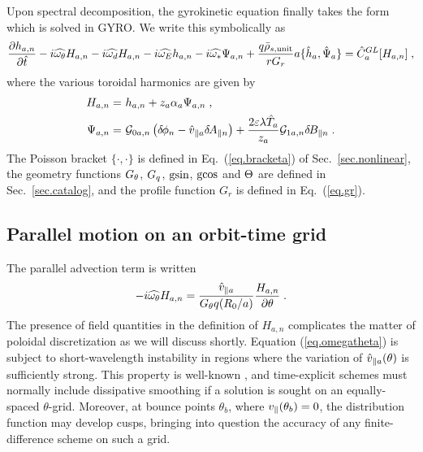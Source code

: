 Upon spectral decomposition, the gyrokinetic equation finally takes 
the form which is solved in GYRO.  We write this symbolically as
%
\begin{equation}
\frac{\partial h_{a,n}}{\partial\hat{t}} 
-i \widehat{\omega_\theta} H_{a,n}
-i \widehat{\omega_d} H_{a,n}
-i \widehat{\omega_E} h_{a,n}
-i \widehat{\omega_*} \Psi_{a,n}
+ \frac{q\bar{\rho}_{s,{\rm unit}}}{r G_r} a \{ \hat{h}_a,\hat{\Psi}_a \}
= \hat{C}_a^{GL} [H_{a,n}] \; ,
\label{eq.hnnorm}
\end{equation}
%
where the various toroidal harmonics are given by
% 
\begin{align}
H_{a,n} = &~h_{a,n} + z_a \alpha_a \Psi_{a,n} \; , \\
\Psi_{a,n} = &~{\cal G}_{0a,n} \left( \delta \hskip -1pt \phi_n - \hat{v}_{\parallel a} \delta \hskip -1pt A_{\parallel n} \right) + 
\frac{2 \varepsilon \lambda \hat{T}_a}{z_a} {\cal G}_{1a,n}\delta \hskip -1pt B_{\parallel n} \; . 
\end{align}
%
The Poisson bracket $\{ \cdot, \cdot \}$ is defined in Eq.~(\ref{eq.bracketa}) 
of Sec.~\ref{sec.nonlinear}, the geometry functions $G_\theta$, $G_q$, $\text{gsin}$, 
$\text{gcos}$ and $\Theta$ are defined in Sec.~\ref{sec.catalog}, and the 
profile function $G_r$ is defined in Eq.~(\ref{eq.gr}). 

\subsection{Parallel motion on an orbit-time grid}

The parallel advection term is written
%
\begin{equation}
-i \widehat{\omega_\theta} H_{a,n} = \frac{\hat{v}_{\parallel a}}{G_\theta q (R_0/a)} 
 \frac{H_{a,n}}{\partial\theta} \; . 
\label{eq.omegatheta}
\end{equation}
%
The presence of field quantities in the definition of $H_{a,n}$ 
complicates the matter of poloidal discretization as we will 
discuss shortly.  Equation (\ref{eq.omegatheta}) is subject to 
short-wavelength instability in regions where the variation of 
$\hat{v}_{\parallel a}(\theta)$ is sufficiently strong.  This property is well-known 
\cite{durran:1999}, and time-explicit schemes must normally 
include dissipative smoothing if a solution is sought on an 
equally-spaced $\theta$-grid.   Moreover, at bounce points 
$\theta_b$, where $v_\parallel(\theta_b) = 0$, the distribution function 
may develop cusps, bringing into question the accuracy of any 
finite-difference scheme on such a grid.

